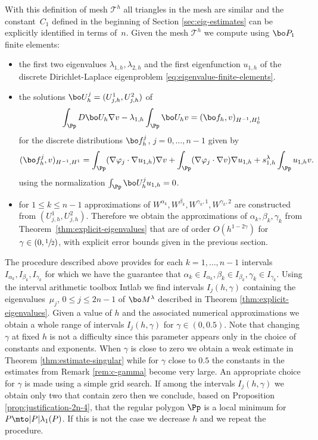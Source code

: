 With this definition of mesh $\mathcal T^h$ all triangles in the mesh are similar and the constant~$C_1$ defined in the beginning of Section \ref{sec:eig-estimates} can be explicitly identified in terms of~$n$. Given the mesh $\mathcal T^h$ we compute using $\bo P_1$ finite elements:
\begin{itemize}
\item the first two eigenvalues $\lambda_{1,h},\lambda_{2,h}$ and the first eigenfunction $u_{1,h}$ of the discrete Dirichlet-Laplace eigenproblem \eqref{eq:eigenvalue-finite-elements}.
\item the solutions $\bo U_h^j = (U_{j,h}^1, U_{j,h}^2)$ of
\[
\int_{\Pp} D\bo U_h \nabla v-\lambda_{1,h}\int_\Pp \bo U_h v = (\bo f_h,v)_{H^{-1},H_0^1}
\]
for the discrete distributions $\bo f_h^j$, $j=0,\dots,n-1$ given by
\begin{equation*}
(\bo f_{h}^j,v)_{H^{-1},H^1} = \int_{\Pp}(\nabla \varphi_j \cdot \nabla u_{1,h})\nabla v +\int_{\Pp}(\nabla \varphi_j\cdot \nabla v)\nabla u_{1,h}+s_{1,h}^\lambda \int_\Pp u_{1,h}v.
\end{equation*}
using the normalization $\int_\Pp \bo U_h^j u_{1,h} = 0$.
\item for $1\leq k \leq n-1$ approximations of $W^{\alpha_k},W^{\beta_k},W^{\gamma_k,1},W^{\gamma_k,2}$ are constructed from $(U_{j,h}^1, U_{j,h}^2)$. Therefore we obtain the approximations of $\alpha_k,\beta_k,\gamma_k$ from Theorem~\ref{thm:explicit-eigenvalues} that are of order $O(h^{1-2\gamma})$ for $\gamma \in (0,\sfrac{1}{2})$, with explicit error bounds given in the previous section.
\end{itemize}
The procedure described above provides for each $k=1,\dots,n-1$ intervals $I_{\alpha_k}, I_{\beta_k}, I_{\gamma_k}$ for which we have the guarantee that $\alpha_k \in I_{\alpha_k},\beta_k \in I_{\beta_k}, \gamma_k \in I_{\gamma_k}$. Using the interval arithmetic toolbox Intlab \cite{intlab} we find intervals $I_j (h,\gamma)$ containing the eigenvalues~$\mu_j$, $0 \leq j \leq 2n-1$ of $\bo M^{\lambda}$ described in Theorem \ref{thm:explicit-eigenvalues}. Given a value of $h$ and the associated numerical approximations we obtain a whole range of intervals $I_j(h,\gamma)$ for $\gamma\in (0,0.5)$. Note that changing $\gamma$ at fixed $h$ is not a difficulty since this parameter appears only in the choice of constants and exponents. When $\gamma$ is close to zero we obtain a weak estimate in Theorem \ref{thm:estimate-singular} while for $\gamma$ close to $0.5$ the constants in the estimates from Remark \ref{rem:c-gamma} become very large. An appropriate choice for $\gamma$ is made using a simple grid search. If among the intervals $I_j(h,\gamma)$ we obtain only two that contain zero then we conclude, based on Proposition \ref{prop:justification-2n-4}, that the regular polygon $\Pp$ is a local minimum for $P\mto |P|\lambda_1(P)$. If this is not the case we decrease $h$ and we repeat the procedure.

